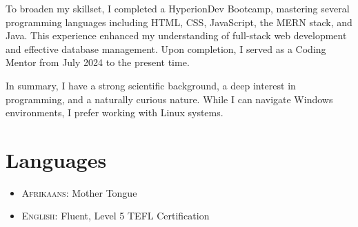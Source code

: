 \documentclass[a4paper,10pt]{article}
\begin{document}
To broaden my skillset, I completed a HyperionDev Bootcamp, mastering several programming languages including HTML, CSS, JavaScript, the MERN stack, and Java. This experience enhanced my understanding of full-stack web development and effective database management. Upon completion, I served as a Coding Mentor from July 2024 to the present time.

In summary, I have a strong scientific background, a deep interest in programming, and a naturally curious nature. While I can navigate Windows environments, I prefer working with Linux systems.
\section*{Languages}
\begin{itemize}
	\item \textsc{Afrikaans}: Mother Tongue
	\item \textsc{English}: Fluent, Level 5 TEFL Certification
\end{itemize}
\end{document}
